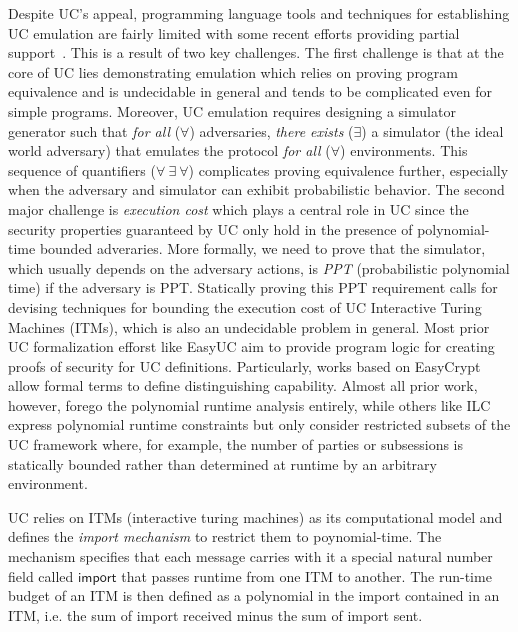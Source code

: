 Despite UC's appeal, programming language tools and techniques for establishing UC emulation are fairly limited with some recent efforts providing
partial support~\cite{ilc,easyuc,ipdl,symbolicuc,barbosa}. This is a result of two key challenges.
The first challenge is that at the core of UC lies demonstrating emulation which relies on proving program equivalence and is undecidable in general
and tends to be complicated even for simple programs.
Moreover, UC emulation requires designing a simulator generator such that \emph{for all} ($\forall$) adversaries, \emph{there exists} ($\exists$) a simulator (the ideal world adversary) that emulates the protocol \emph{for all} ($\forall$) environments.
This sequence of quantifiers ($\forall \ \exists \ \forall$) complicates proving equivalence further, especially when the adversary and simulator can exhibit
probabilistic behavior.
The second major challenge is \emph{execution cost} which plays a central role in UC since the security properties
guaranteed by UC only hold in the presence of polynomial-time bounded adveraries.
More formally, we need to prove that the simulator, which usually depends on the adversary actions, is \emph{PPT} (probabilistic polynomial time)
if the adversary is PPT.
Statically proving this PPT requirement calls for devising techniques for bounding the execution cost of UC Interactive Turing Machines (ITMs),
which is also an undecidable problem in general.
Most prior UC formalization efforst like EasyUC aim to provide program logic for creating proofs of security for UC definitions\cite{ipdl,barbosa,easyuc}. Particularly, works based on EasyCrypt \cite{easyuc,barbosa} allow formal terms to define distinguishing capability.
Almost all prior work, however, forego the polynomial runtime analysis entirely, while others like ILC express polynomial runtime constraints but only consider restricted subsets of the UC framework where, for example, the number of parties or subsessions is statically bounded rather than determined at runtime by an arbitrary environment.

UC relies on ITMs (interactive turing machines) as its computational model and defines the \emph{import mechanism} to restrict them to poynomial-time. 
The mechanism specifies that each message carries with it a special natural number field called $\mathsf{import}$ that passes runtime from one ITM to another. 
The run-time budget of an ITM is then defined as a polynomial in the import contained in an ITM, i.e. the sum of import received minus the sum of import sent.

